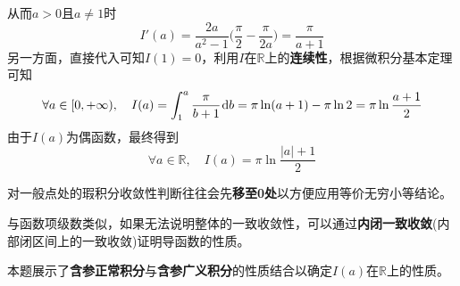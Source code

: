 \documentclass[a4paper,UTF8,fontset=windows,AutoFakeBold]{ctexart}
\newcommand*{\dr}{\hspace{0.07em}\mathrm{d}}
\newcommand*{\rb}{\mathbb{R}}
\newcommand*{\note}{\noindent *}
\theoremstyle{ex}
\begin{document}
\begin{framed}
{\begin{itemize}
        从而$a>0$且$a\ne1$时
        $$I'(a)=\frac{2a}{a^2-1}\bigg(\frac{\pi}{2}-\frac{\pi}{2a}\bigg)=\frac{\pi}{a+1}$$
        另一方面，直接代入可知$I(1)=0$，利用$I$在$\rb$上的\textbf{连续性}，根据微积分基本定理可知
        $$\forall a\in[0,+\infty),\quad I(a)=\int_1^a\frac{\pi}{b+1}\dr b=\pi\ln(a+1)-\pi\ln2=\pi\ln\frac{a+1}{2}$$
        由于$I(a)$为偶函数，最终得到
        $$\forall a\in\rb,\quad I(a)=\pi\ln\frac{|a|+1}{2}$$
    \end{itemize}
}
\end{framed}

\note 对一般点处的瑕积分收敛性判断往往会先\textbf{移至0处}以方便应用等价无穷小等结论。

\note 与函数项级数类似，如果无法说明整体的一致收敛性，可以通过\textbf{内闭一致收敛}(内部闭区间上的一致收敛)证明导函数的性质。

\note 本题展示了\textbf{含参正常积分}与\textbf{含参广义积分}的性质结合以确定$I(a)$在$\rb$上的性质。
\end{document}
